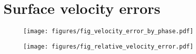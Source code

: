 \documentclass[lineno]{jfm}
\begin{document}
\section{Surface velocity errors}
\label{appendix:surface_velocity_errors}

\begin{figure}
\centering
\texttt{[image: figures/fig\_velocity\_error\_by\_phase.pdf]}
\caption{
}
\label{fig:velocity_error_by_phase}
\end{figure}


\begin{figure}
\centering
\texttt{[image: figures/fig\_relative\_velocity\_error.pdf]}
\caption{
}
\label{fig:relative_velocity_error}
\end{figure}



\end{document}
